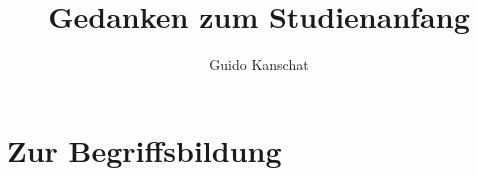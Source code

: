\documentclass{article}
\title{Gedanken zum Studienanfang}
\author{Guido Kanschat}
\begin{document}
\maketitle

\section{Zur Begriffsbildung}
\end{document}
